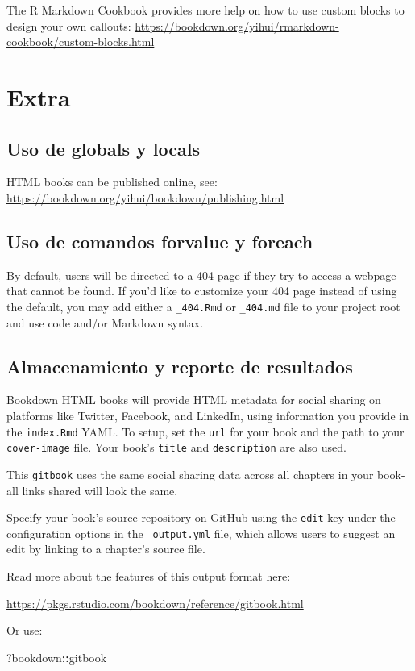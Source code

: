 \documentclass[
]{book}
\newenvironment{Shaded}{\begin{snugshade}}{\end{snugshade}}
\newcommand{\NormalTok}[1]{#1}
\newcommand{\SpecialCharTok}[1]{\textcolor[rgb]{0.81,0.36,0.00}{\textbf{#1}}}
\theoremstyle{definition}
\theoremstyle{definition}
\theoremstyle{definition}
\theoremstyle{definition}
\theoremstyle{remark}
\begin{document}
The R Markdown Cookbook provides more help on how to use custom blocks to design your own callouts: \url{https://bookdown.org/yihui/rmarkdown-cookbook/custom-blocks.html}

\hypertarget{extra}{%
\chapter{Extra}\label{extra}}

\hypertarget{uso-de-globals-y-locals}{%
\section{Uso de globals y locals}\label{uso-de-globals-y-locals}}

HTML books can be published online, see: \url{https://bookdown.org/yihui/bookdown/publishing.html}

\hypertarget{uso-de-comandos-forvalue-y-foreach}{%
\section{Uso de comandos forvalue y foreach}\label{uso-de-comandos-forvalue-y-foreach}}

By default, users will be directed to a 404 page if they try to access a webpage that cannot be found. If you'd like to customize your 404 page instead of using the default, you may add either a \texttt{\_404.Rmd} or \texttt{\_404.md} file to your project root and use code and/or Markdown syntax.

\hypertarget{almacenamiento-y-reporte-de-resultados}{%
\section{Almacenamiento y reporte de resultados}\label{almacenamiento-y-reporte-de-resultados}}

Bookdown HTML books will provide HTML metadata for social sharing on platforms like Twitter, Facebook, and LinkedIn, using information you provide in the \texttt{index.Rmd} YAML. To setup, set the \texttt{url} for your book and the path to your \texttt{cover-image} file. Your book's \texttt{title} and \texttt{description} are also used.

This \texttt{gitbook} uses the same social sharing data across all chapters in your book- all links shared will look the same.

Specify your book's source repository on GitHub using the \texttt{edit} key under the configuration options in the \texttt{\_output.yml} file, which allows users to suggest an edit by linking to a chapter's source file.

Read more about the features of this output format here:

\url{https://pkgs.rstudio.com/bookdown/reference/gitbook.html}

Or use:

\begin{Shaded}
\begin{Highlighting}[]
\NormalTok{?bookdown}\SpecialCharTok{::}\NormalTok{gitbook}
\end{Highlighting}
\end{Shaded}


  
\end{document}
